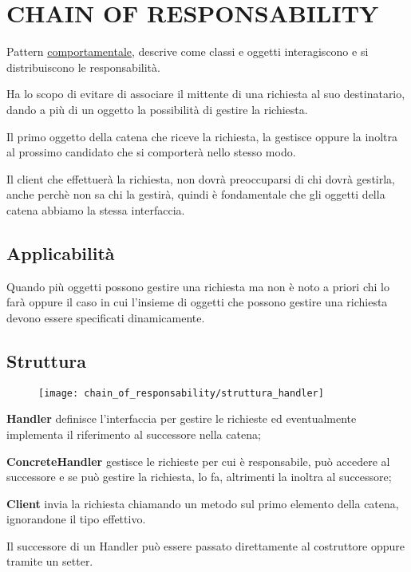 \chapter{CHAIN OF RESPONSABILITY}

Pattern \underline{comportamentale}, descrive come classi e oggetti interagiscono e si distribuiscono le responsabilità. 
\smallskip

Ha lo scopo di evitare di associare il mittente di una richiesta al suo destinatario, dando a più di un oggetto la possibilità di gestire la richiesta.

Il primo oggetto della catena che riceve la richiesta, la gestisce oppure la inoltra al prossimo candidato che si comporterà nello stesso modo. 
\smallskip

Il client che effettuerà la richiesta, non dovrà preoccuparsi di chi dovrà gestirla, anche perchè non sa chi la gestirà, quindi è fondamentale che gli oggetti 
della catena abbiamo la stessa interfaccia.

\section{Applicabilità}

Quando più oggetti possono gestire una richiesta ma non è noto a priori chi lo farà oppure il caso in cui l’insieme di oggetti che possono gestire una richiesta devono 
essere specificati dinamicamente.

\section{Struttura}

\begin{figure}[H]
    \centering
    \texttt{[image: chain\_of\_responsability/struttura\_handler]}
\end{figure}

\textbf{Handler} definisce l'interfaccia per gestire le richieste ed eventualmente implementa il riferimento al successore nella catena;

\textbf{ConcreteHandler} gestisce le richieste per cui è responsabile, può accedere al successore e se può gestire la richiesta, lo fa, altrimenti la inoltra al 
successore;

\textbf{Client} invia la richiesta chiamando un metodo sul primo elemento della catena, ignorandone il tipo effettivo.
\medskip

Il successore di un Handler può essere passato direttamente al costruttore oppure tramite un setter.

